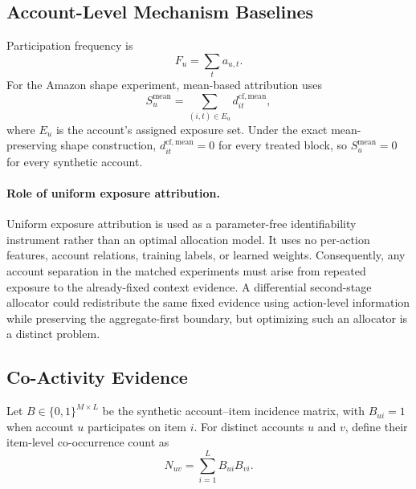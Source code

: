 
\subsection{Account-Level Mechanism Baselines}
\label{sec:supp-account-baselines}

Participation frequency is
\begin{equation}
\label{eq:supp-frequency-score}
F_u
=
\sum_t a_{u,t}.
\end{equation}
For the Amazon shape experiment, mean-based attribution uses
\begin{equation}
\label{eq:supp-mean-account-score}
S_u^{\mathrm{mean}}
=
\sum_{(i,t)\in E_u}
d_{it}^{\mathrm{cf},\mathrm{mean}},
\end{equation}
where $E_u$ is the account's assigned exposure set. Under the exact
mean-preserving shape construction,
$d_{it}^{\mathrm{cf},\mathrm{mean}}=0$ for every treated block, so
$S_u^{\mathrm{mean}}=0$ for every synthetic account.

\paragraph{Role of uniform exposure attribution.}
Uniform exposure attribution is used as a parameter-free
identifiability instrument rather than an optimal allocation model.
It uses no per-action features, account relations, training labels,
or learned weights. Consequently, any account separation in the
matched experiments must arise from repeated exposure to the
already-fixed context evidence. A differential second-stage allocator
could redistribute the same fixed evidence using action-level
information while preserving the aggregate-first boundary, but
optimizing such an allocator is a distinct problem.


\subsection{Co-Activity Evidence}
\label{sec:supp-coactivity}

Let $B\in\{0,1\}^{M\times L}$ be the synthetic account--item incidence
matrix, with $B_{ui}=1$ when account $u$ participates on item $i$. For
distinct accounts $u$ and $v$, define their item-level co-occurrence count as
\begin{equation}
\label{eq:supp-cooccur}
N_{uv}
=
\sum_{i=1}^{L}B_{ui}B_{vi}.
\end{equation}


